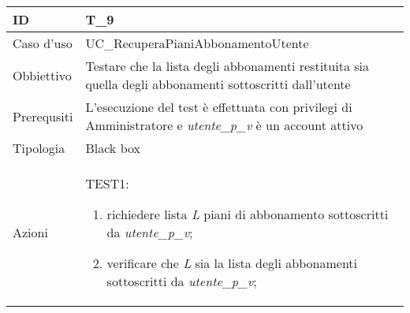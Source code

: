\begin{table}[hb]
    \centering
    \begin{tabular}{ |p{2cm}|p{10cm}|  }
        \hline
        ID          & T\_9                                                                                                      \\\hline
        Caso d'uso  & UC\_RecuperaPianiAbbonamentoUtente                                                                        \\\hline
        Obbiettivo  & Testare che la lista degli abbonamenti restituita sia quella degli abbonamenti
        sottoscritti dall'utente                                                                                                \\\hline
        Prerequsiti & L'esecuzione del test è effettuata con privilegi di Amministratore e \emph{utente\_p\_v} è un account attivo \\\hline
        Tipologia   & Black box                                                                                                 \\\hline
        Azioni      &
        TEST1:
        \begin{enumerate}[nosep, topsep=0pt]
            \item richiedere lista \emph{L} piani di abbonamento sottoscritti da \emph{utente\_p\_v};
            \item verificare che \emph{L} sia la lista degli abbonamenti sottoscritti da \emph{utente\_p\_v};
        \end{enumerate}
        \\\hline
    \end{tabular}
\end{table}

